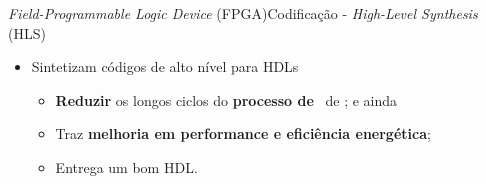     \begin{frame}{\textit{Field-Programmable Logic Device} (FPGA)}{Codificação - \textit{High-Level Synthesis} (HLS)} 
    \vspace{-1em}
    \begin{itemize}
        \setlength{\itemsep}{0.9em}
        \item Sintetizam códigos de alto nível para HDLs \cite{Choi2016} \cite{Trevett2008}
        \begin{itemize}
            \setlength{\itemsep}{1.2em}
            \item \textbf{Reduzir} os longos ciclos do \textbf{processo de \design}\ de \hardware; e ainda
            \item Traz \textbf{melhoria em performance e eficiência energética};
            \item Entrega um bom HDL.
        \end{itemize}
        
        
    \end{itemize}
    \end{frame}
    
    
    
